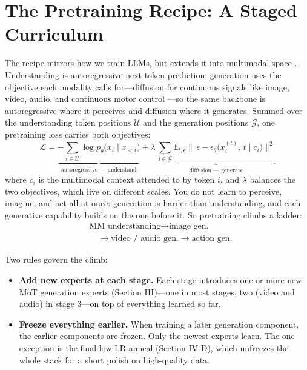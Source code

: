\documentclass[10pt,conference]{IEEEtran}
\begin{document}
\section{The Pretraining Recipe: A Staged Curriculum}
The recipe mirrors how we train LLMs, but extends it into multimodal space
\cite{ref19}. Understanding is autoregressive next-token prediction; generation
uses the objective each modality calls for---diffusion for continuous signals
like image, video, audio, and continuous motor control \cite{ref2}---so the same
backbone is autoregressive where it perceives and diffusion where it generates.
Summed over the understanding token positions $\mathcal{U}$ and the generation
positions $\mathcal{G}$, one pretraining loss carries both objectives:
\begin{equation}
\mathcal{L} =
\underbrace{-\sum_{i\in\mathcal{U}}\log p_\theta\big(x_i \mid x_{<i}\big)}_{\text{autoregressive --- understand}}
+ \lambda\,
\underbrace{\sum_{i\in\mathcal{G}}\mathbb{E}_{t,\epsilon}\big\|\,\epsilon - \epsilon_\theta\big(x_i^{(t)},\,t \mid c_i\big)\big\|^2}_{\text{diffusion --- generate}}
\end{equation}
where $c_i$ is the multimodal context attended to by token $i$, and $\lambda$
balances the two objectives, which live on different scales. You do not learn to
perceive, imagine, and act all at once: generation is harder than understanding,
and each generative capability builds on the one before it. So pretraining climbs
a ladder:
\begin{equation*}
\begin{aligned}
&\text{MM understanding} \rightarrow \text{image gen.} \\
&\quad\rightarrow \text{video / audio gen.} \rightarrow \text{action gen.}
\end{aligned}
\end{equation*}

Two rules govern the climb:
\begin{itemize}
\item \textbf{Add new experts at each stage.} Each stage introduces one or more
new MoT generation experts (Section III)---one in most stages, two (video and
audio) in stage 3---on top of everything learned so far.
\item \textbf{Freeze everything earlier.} When training a later generation
component, the earlier components are frozen. Only the newest experts learn. The
one exception is the final low-LR anneal (Section IV-D), which unfreezes the
whole stack for a short polish on high-quality data.
\end{itemize}
\end{document}
